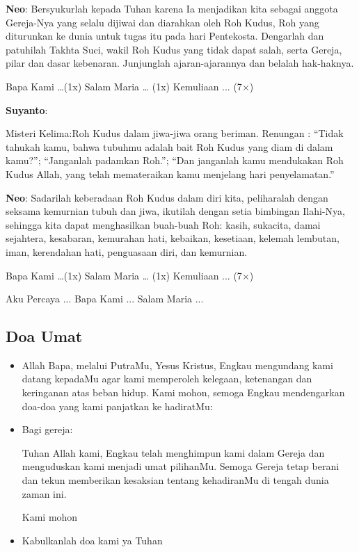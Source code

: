 \documentclass[12pt]{article}
\def\petugasA{\textbf{Suyanto}}
\def\petugasB{\textbf{Neo}}
\newcommand{\BU}[1]{\begin{itemize} \item[U:] #1 \end{itemize}}
\newcommand{\BP}[1]{\begin{itemize} \item[P:] #1 \end{itemize}}
\begin{document}
\petugasB: Bersyukurlah kepada Tuhan karena Ia menjadikan kita sebagai
anggota Gereja-Nya yang selalu dijiwai dan diarahkan oleh Roh Kudus,
Roh yang diturunkan ke dunia untuk tugas itu pada hari Pentekosta.
Dengarlah dan patuhilah Takhta Suci, wakil Roh Kudus yang tidak dapat
salah, serta Gereja, pilar dan dasar kebenaran. Junjunglah
ajaran-ajarannya dan belalah hak-haknya.

 Bapa Kami {\dots}(1x) Salam Maria {\dots} (1x) Kemuliaan ... (7$\times$)

\petugasA:

Misteri Kelima:{\textquotedbl}Roh Kudus dalam jiwa-jiwa orang
beriman.{\textquotedbl} Renungan : {\textquotedblleft}Tidak tahukah
kamu, bahwa tubuhmu adalah bait Roh Kudus yang diam di dalam
kamu?{\textquotedblright}; {\textquotedblleft}Janganlah padamkan
Roh.{\textquotedblright}; {\textquotedblleft}Dan janganlah kamu
mendukakan Roh Kudus Allah, yang telah memateraikan kamu menjelang hari
penyelamatan.{\textquotedblright}

\petugasB: Sadarilah keberadaan Roh Kudus dalam diri kita, peliharalah dengan
seksama kemurnian tubuh dan jiwa, ikutilah dengan setia bimbingan
Ilahi-Nya, sehingga kita dapat menghasilkan buah-buah Roh: kasih,
sukacita, damai sejahtera, kesabaran, kemurahan hati, kebaikan,
kesetiaan, kelemah lembutan, iman, kerendahan hati, penguasaan diri,
dan kemurnian.

 Bapa Kami {\dots}(1x) Salam Maria {\dots} (1x) Kemuliaan ... (7$\times$)

Aku Percaya ... Bapa Kami ... Salam Maria ...

\subsection*{Doa Umat}

\BP{Allah Bapa, melalui PutraMu, Yesus Kristus, Engkau mengundang kami datang kepadaMu agar kami memperoleh kelegaan, ketenangan dan keringanan atas beban hidup. Kami mohon, semoga Engkau mendengarkan doa-doa yang kami panjatkan ke hadiratMu:}

\BP{Bagi gereja:
	
	Tuhan Allah kami, Engkau telah menghimpun kami dalam Gereja dan menguduskan kami menjadi umat pilihanMu. Semoga Gereja tetap berani dan tekun memberikan kesaksian tentang kehadiranMu di tengah dunia zaman ini.
	
	Kami mohon}

\BU{Kabulkanlah doa kami ya Tuhan}
\end{document}
